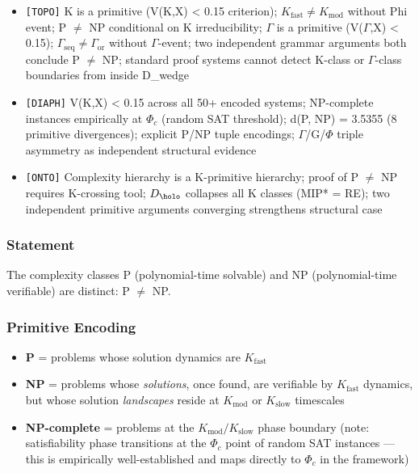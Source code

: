 \documentclass[12pt,a4paper]{article}
\begin{document}
\begin{itemize}
    \item \texttt{{[}TOPO{]}} K is a primitive (V(K,X) \textless{} 0.15 criterion); $K_{\text{fast}} \neq K_{\text{mod}}$ without Phi event; P $\neq$ NP conditional on K irreducibility; $\Gamma$ is a primitive (V($\Gamma$,X) \textless{} 0.15); $\Gamma_{\text{seq}} \neq \Gamma_{\text{or}}$ without $\Gamma$-event; two independent grammar arguments both conclude P $\neq$ NP; standard proof systems cannot detect K-class or $\Gamma$-class boundaries from inside D\_wedge
    \item \texttt{{[}DIAPH{]}} V(K,X) \textless{} 0.15 across all 50+ encoded systems; NP-complete instances empirically at $\Phi_c$ (random SAT threshold); d(P, NP) = 3.5355 (8 primitive divergences); explicit P/NP tuple encodings; $\Gamma$/G/$\Phi$ triple asymmetry as independent structural evidence
    \item \texttt{{[}ONTO{]}} Complexity hierarchy is a K-primitive hierarchy; proof of P $\neq$ NP requires K-crossing tool; $D_{\holo}$ collapses all K classes (MIP* = RE); two independent primitive arguments converging strengthens structural case
\end{itemize}

\subsubsection{Statement}

The complexity classes P (polynomial-time solvable) and NP (polynomial-time verifiable) are distinct: P $\neq$ NP.

\subsubsection{Primitive Encoding}

\begin{itemize}
    \item \textbf{P} = problems whose solution dynamics are $K_{\text{fast}}$
    \item \textbf{NP} = problems whose \emph{solutions}, once found, are verifiable by $K_{\text{fast}}$ dynamics, but whose solution \emph{landscapes} reside at $K_{\text{mod}}$ or $K_{\text{slow}}$ timescales
    \item \textbf{NP-complete} = problems at the $K_{\text{mod}}/K_{\text{slow}}$ phase boundary (note: satisfiability phase transitions at the $\Phi_c$ point of random SAT instances --- this is empirically well-established and maps directly to $\Phi_c$ in the framework)
\end{itemize}
\end{document}
